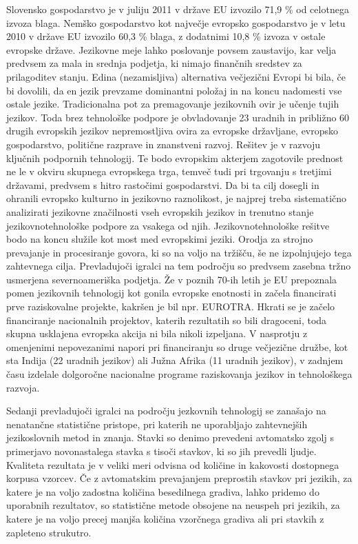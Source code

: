 \begin{multicols}{2}
Slovensko gospodarstvo je v juliju 2011 v države EU izvozilo 71,9 \% od celotnega izvoza blaga. Nemško gospodarstvo kot naj\-večje evropsko gospodarstvo je v letu 2010 v države EU izvozilo 60,3 \% blaga, z dodatnimi 10,8 \% izvoza v ostale evropske države. Jezikovne meje lahko poslovanje povsem zaustavijo, kar velja predvsem za mala in srednja podjetja, ki nimajo finančnih sredstev za prilagoditev stanju. Edina (nezamisljiva) alternativa večjezični Evropi bi bila, če bi dovolili, da en jezik prevzame dominantni položaj in na koncu nadomesti vse ostale jezike. Tradicionalna pot za premagovanje jezikovnih ovir je učenje tujih jezikov. Toda brez tehnološke podpore je obvladovanje 23 uradnih in približno 60 drugih evropskih jezikov nepremostljiva ovira za evropske držav\-ljane, evropsko gospodarstvo, politične razprave in znanstveni razvoj. Rešitev je v razvoju ključnih podpornih tehnologij. Te bodo evropskim akterjem zagotovile prednost ne le v okviru skupnega evropskega trga, temveč tudi pri trgovanju s tretjimi državami, predvsem s hitro rastočimi gospodarstvi. Da bi ta cilj dosegli in ohranili evropsko kulturno in jezikovno raznolikost, je naj\-prej treba sistema\-tično analizirati jezikovne značilnosti vseh evropskih jezikov in trenutno stanje jezikovnotehnološke podpore za vsakega od njih. Jezikovnotehnološke rešitve bodo na koncu služile kot most med evropskimi jeziki. Orodja za stroj\-no prevajanje in procesiranje go\-vora, ki so na voljo na tržišču, še ne izpolnjujejo tega zah\-tevnega cilja. Prevladujoči igralci na tem področju so predvsem zasebna tržno usmerjena severno\-ameriška podjetja. Že v poznih 70-ih letih je EU prepoznala po\-men jezikovnih tehnologij kot gonila evropske enotnosti in začela financirati prve raziskovalne projekte, kakršen je bil npr. EUROTRA. Hkrati se je začelo financiranje nacionalnih projektov, katerih rezultatih so bili dragoceni, toda skupna usklajena evropska akcija ni bila nikoli izpeljana. V nasprotju z omenjenimi nepovezanimi napori pri financiranju so druge večjezične družbe, kot sta Indija (22 uradnih jezikov) ali Južna Afrika (11 uradnih jezikov), v zadnjem času izdelale dolgoročne nacionalne programe raziskovanja jezikov in tehnološkega razvoja.


Sedanji prevladujoči igralci na področju jezkovnih tehnologij se zanašajo na nenatančne statistične pristope, pri katerih ne uporab\-ljajo zah\-tevnej\-ših jezikoslovnih metod in znanja. Stavki so denimo prevedeni avtomatsko zgolj s primerjavo novonastalega stavka s tisoči stavkov, ki so jih prevedli ljudje. Kvaliteta rezultata je v veliki meri odvisna od količine in kakovosti dostopnega korpusa vzorcev. Če z avtomatskim prevajanjem preprostih stavkov pri jezikih, za katere je na voljo zadostna količina besedilnega gradiva, lahko pridemo do uporabnih rezultatov, so statistične metode obsojene na neuspeh pri jezikih, za katere je na voljo precej manjša količina vzorčnega gradiva ali pri stavkih z zapleteno strukutro.


\end{multicols}
